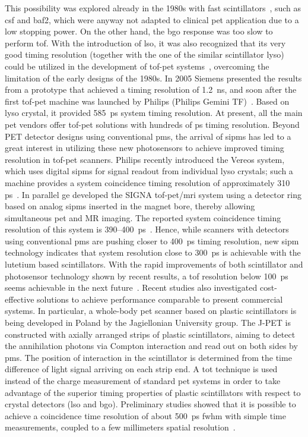 This possibility was explored already in the 1980s with fast scintillators~\parencite{Ter-Pogossian1982, Lewellen1988}, such as \gls{csf} and \gls{baf2}, which were anyway not adapted to clinical \gls{pet} application due to a low stopping power. On the other hand, the \gls{bgo} response was too slow to perform \gls{tof}. With the introduction of \gls{lso}, it was also recognized that its very good timing resolution (together with the one of the similar scintillator \gls{lyso}) could be utilized in the development of \gls{tof}-\gls{pet} systems~\parencite{Moses1999}, overcoming the limitation of the early designs of the 1980s. In 2005 Siemens presented the results from a prototype that achieved a timing resolution of 1.2~ns, and soon after the first \gls{tof}-\gls{pet} machine was launched by Philips (Philips Gemini TF)~\parencite{Karp2008}.  Based on \gls{lyso} crystal, it provided 585~ps system timing resolution. At present, all the main \gls{pet} vendors offer \gls{tof}-\gls{pet} solutions with hundreds of ps timing resolution. 
Beyond PET detector designs using conventional \glspl{pm}, the arrival of \glspl{sipm} has led to a great interest in utilizing these new photosensors to achieve improved timing resolution in \gls{tof}-\gls{pet} scanners. Philips recently introduced the Vereos system, which uses digital  \glspl{sipm} for signal readout from individual \gls{lyso} crystals; such a machine provides a system coincidence timing resolution of approximately 310 ps~\parencite{Miller2015}. In parallel \gls{ge} developed the SIGNA \gls{tof}-\gls{pet}/\gls{mri} system using a detector ring based on analog \glspl{sipm} inserted in the magnet bore, thereby
allowing simultaneous \gls{pet} and MR imaging. The reported system coincidence timing resolution of this system is 390–400~ps~\parencite{Levin2013}. Hence, while scanners with detectors using conventional \glspl{pm} are pushing closer to 400~ps timing resolution, new \gls{sipm} technology indicates that system resolution close to 300~ps is achievable with the lutetium based scintillators.
With the rapid improvements of both scintillator and photosensor technology shown by recent results, a \gls{tof} resolution below 100~ps seems achievable in the next future~\parencite{Surti2016, Lecoq2017}.
Recent studies also investigated cost-effective solutions to achieve performance comparable to present commercial systems. In particular, a whole-body \gls{pet} scanner based on plastic scintillators is being developed in Poland by the Jagiellonian University group. The J-PET is constructed with axially arranged strips of plastic scintillators, aiming to detect the annihilation photons via Compton interaction and read out on both sides by \glspl{pm}. The position of interaction in the scintillator is determined from the time difference of light signal arriving on each strip end. A \gls{tot} technique is used instead of the charge measurement of standard \gls{pet} systems in order to take advantage of the superior timing properties of plastic scintillators with respect to crystal detectors (\gls{lso} and \gls{bgo}). Preliminary studies showed that it is possible to achieve a coincidence time resolution of about 500~ps \gls{fwhm} with simple time measurements, coupled to a few millimeters spatial resolution~\parencite{Niedzwiecki2017}.

